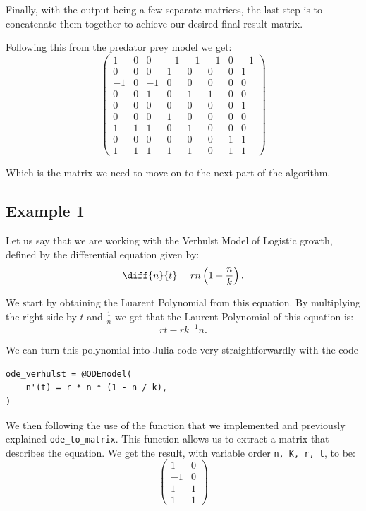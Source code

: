 \documentclass[oneside, a4paper, onecolumn, 11pt]{article}
\begin{document}

Finally, with the output being a few separate matrices, the last step is to concatenate them together to achieve our desired final result matrix.

Following this from the predator prey model we get:
\[
    \begin{pmatrix}
        1  & 0 & 0  & -1 & -1 & -1 & 0 & -1 \\
        0  & 0 & 0  & 1  & 0  & 0  & 0 & 1  \\
        -1 & 0 & -1 & 0  & 0  & 0  & 0 & 0  \\
        0  & 0 & 1  & 0  & 1  & 1  & 0 & 0  \\
        0  & 0 & 0  & 0  & 0  & 0  & 0 & 1  \\
        0  & 0 & 0  & 1  & 0  & 0  & 0 & 0  \\
        1  & 1 & 1  & 0  & 1  & 0  & 0 & 0  \\
        0  & 0 & 0  & 0  & 0  & 0  & 1 & 1  \\
        1  & 1 & 1  & 1  & 1  & 0  & 1 & 1
    \end{pmatrix}
\]

Which is the matrix we need to move on to the next part of the algorithm.

\subsection{Example 1}

Let us say that we are working with the Verhulst Model of Logistic growth, defined by the differential equation given by:
\[
    \diff{n}{t} = rn \left( 1 - \frac{n}{k} \right).
\]

We start by obtaining the Luarent Polynomial from this equation. By multiplying the right side by \(t\) and \(\frac{1}{n}\) we get that the Laurent Polynomial of this equation is:
\[
    r t - r k^{-1} n.
\]

We can turn this polynomial into Julia code very straightforwardly with the code
\begin{lstlisting}
ode_verhulst = @ODEmodel(
    n'(t) = r * n * (1 - n / k),
)
\end{lstlisting}

We then following the use of the function that we implemented and previously explained \texttt{ode\_to\_matrix}. This function allows us to extract a matrix that describes the equation. We get the result, with variable order \texttt{n, K, r, t}, to be:
\[
    \begin{pmatrix}
        1  & 0 \\
        -1 & 0 \\
        1  & 1 \\
        1  & 1
    \end{pmatrix}
\]
\end{document}
